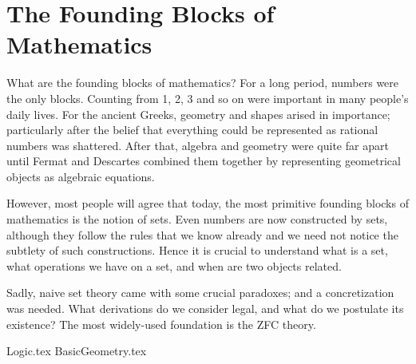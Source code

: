 \part[Blocks]{The Founding Blocks of Mathematics}
\label{prt:blocks}

What are the founding blocks of mathematics?
For a long period, numbers were the only blocks.
Counting from 1, 2, 3 and so on were important
in many people's daily lives.
For the ancient Greeks,
geometry and shapes arised in importance;
particularly after
the belief that everything could be represented as rational numbers
was shattered.
After that, algebra and geometry were quite far apart
until Fermat and Descartes combined them together
by representing geometrical objects as algebraic equations.

However, most people will agree that
today, the most primitive founding blocks of mathematics
is the notion of sets.
Even numbers are now constructed by sets,
although they follow the rules that we know already
and we need not notice the subtlety of such constructions.
Hence it is crucial to understand
what is a set,
what operations we have on a set,
and when are two objects related.

Sadly, naive set theory came with some crucial paradoxes;
and a concretization was needed.
What derivations do we consider legal,
and what do we postulate its existence?
The most widely-used foundation is the ZFC theory.

{Logic.tex}
{BasicGeometry.tex}